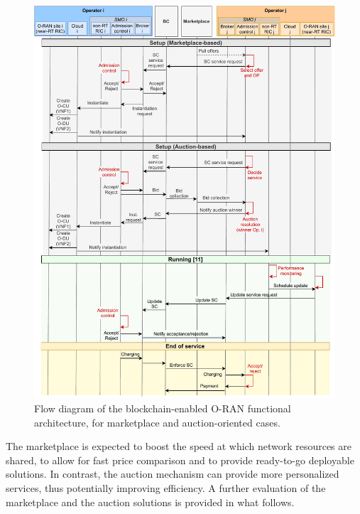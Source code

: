 \documentclass[journal]{IEEEtran}
\begin{document}
	\begin{figure}[ht!]
		\centering
		\includegraphics[width=1\columnwidth]{flowdiagram_complete.pdf}
		\caption{Flow diagram of the blockchain-enabled O-RAN functional architecture, for marketplace and auction-oriented cases.}
		\label{fig:functionalarchitectureflowdiagram}
	\end{figure}
	
	The marketplace is expected to boost the speed at which network resources are shared, to allow for fast price comparison and to provide ready-to-go deployable solutions. In contrast, the auction mechanism can provide more personalized services, thus potentially improving efficiency. A further evaluation of the marketplace and the auction solutions is provided in what follows.
	
\end{document}
